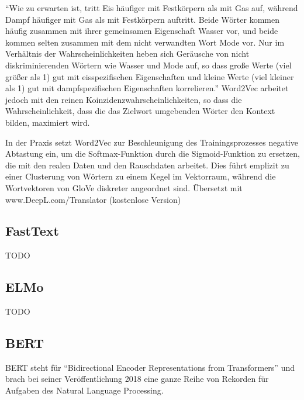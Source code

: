 \documentclass[11pt]{article}
\makeatletter
\newcommand{\boxspacing}{\kern\kvtcb@left@rule\kern\kvtcb@boxsep}
\newcommand{\prompt}[4]{
        \ttfamily\llap{{\color{#2}[#3]:\hspace{3pt}#4}}\vspace{-\baselineskip}
    }
\makeatother
\begin{document}
``Wie zu erwarten ist, tritt Eis häufiger mit Festkörpern als mit Gas
auf, während Dampf häufiger mit Gas als mit Festkörpern auftritt. Beide
Wörter kommen häufig zusammen mit ihrer gemeinsamen Eigenschaft Wasser
vor, und beide kommen selten zusammen mit dem nicht verwandten Wort Mode
vor. Nur im Verhältnis der Wahrscheinlichkeiten heben sich Geräusche von
nicht diskriminierenden Wörtern wie Wasser und Mode auf, so dass große
Werte (viel größer als 1) gut mit eisspezifischen Eigenschaften und
kleine Werte (viel kleiner als 1) gut mit dampfspezifischen
Eigenschaften korrelieren.'' Word2Vec arbeitet jedoch mit den reinen
Koinzidenzwahrscheinlichkeiten, so dass die Wahrscheinlichkeit, dass die
das Zielwort umgebenden Wörter den Kontext bilden, maximiert wird.

In der Praxis setzt Word2Vec zur Beschleunigung des Trainingsprozesses
negative Abtastung ein, um die Softmax-Funktion durch die
Sigmoid-Funktion zu ersetzen, die mit den realen Daten und den
Rauschdaten arbeitet. Dies führt emplizit zu einer Clusterung von
Wörtern zu einem Kegel im Vektorraum, während die Wortvektoren von GloVe
diskreter angeordnet sind. Übersetzt mit www.DeepL.com/Translator
(kostenlose Version)

    \hypertarget{fasttext}{%
\subsection{FastText}\label{fasttext}}

TODO

    \hypertarget{elmo}{%
\subsection{ELMo}\label{elmo}}

TODO

    \hypertarget{bert}{%
\subsection{BERT}\label{bert}}

BERT steht für ``Bidirectional Encoder Representations from
Transformers'' und brach bei seiner Veröffentlichung 2018 eine ganze
Reihe von Rekorden für Aufgaben des Natural Language Processing.

    \begin{tcolorbox}[breakable, size=fbox, boxrule=1pt, pad at break*=1mm,colback=cellbackground, colframe=cellborder]
\prompt{In}{incolor}{ }{\boxspacing}
\begin{Verbatim}[commandchars=\\\{\}]

\end{Verbatim}
\end{tcolorbox}


    
    
    
\end{document}
